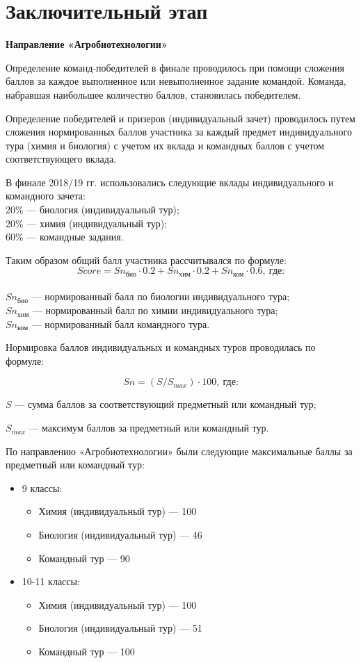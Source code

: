 \section{Заключительный этап}

\textbf{Направление «Агробиотехнологии»}

Определение команд-победителей в финале проводилось при помощи сложения баллов за каждое выполненное или невыполненное задание командой. Команда, набравшая наибольшее количество баллов, становилась победителем.

Определение победителей и призеров (индивидуальный зачет) проводилось путем сложения нормированных баллов участника за каждый предмет индивидуального тура (химия и биология) с учетом их вклада и командных баллов с учетом соответствующего вклада.

В финале 2018/19 гг. использовались следующие вклады индивидуального и командного зачета:\\
20\% — биология (индивидуальный тур); \\
20\% — химия (индивидуальный тур); \\
60\% — командные задания.

Таким образом общий балл участника рассчитывался по формуле:
$$Score = Sn_\text{био} \cdot 0.2 + Sn_\text{хим} \cdot 0.2 + Sn_\text{ком} \cdot 0.6, \: \text{где:}$$\\
$Sn_\text{био}$ — нормированный балл по биологии индивидуального тура;\\
$Sn_\text{хим}$ — нормированный балл по химии индивидуального тура;\\
$Sn_\text{ком}$ — нормированный балл командного тура.

Нормировка баллов индивидуальных и командных туров проводилась по формуле:

$$Sn = (S / S_{max}) \cdot 100, \: \text{где:}$$

$S$ — сумма баллов за соответствующий предметный или командный тур;

$S_{max}$ — максимум баллов за предметный или командный тур.

По направлению «Агробиотехнологии» были следующие максимальные баллы за предметный или командный тур:
\begin{itemize}
    \item 9 классы:
    \begin{itemize}
        \item Химия (индивидуальный тур) — 100 
        \item Биология (индивидуальный тур) — 46
        \item Командный тур — 90
    \end{itemize}
    \item 10-11 классы:
    \begin{itemize}
        \item Химия (индивидуальный тур) — 100
        \item Биология (индивидуальный тур) — 51
        \item Командный тур — 100
    \end{itemize}
\end{itemize}

